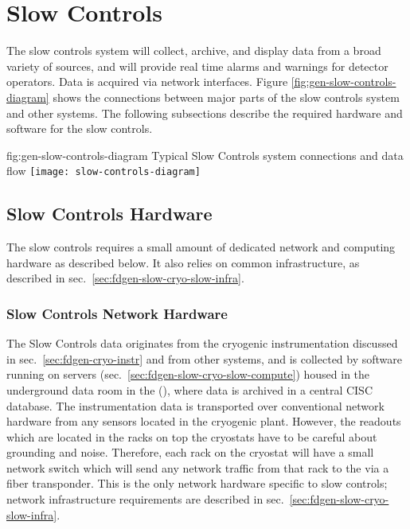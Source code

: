 \section{Slow Controls}
\label{sec:fdgen-slow-cryo-ctrl}


The slow controls system will collect, archive, and display data from
a broad variety of sources, and will provide real time alarms and
warnings for detector operators. Data is acquired via network
interfaces.  Figure \ref{fig:gen-slow-controls-diagram} shows the
connections between major parts of the slow controls system and other
systems.  The following subsections describe the required hardware and
software for the slow controls.

\begin{dunefigure}{fig:gen-slow-controls-diagram}
{Typical Slow Controls system connections and data flow}
\texttt{[image: slow-controls-diagram]}
\end{dunefigure}





\subsection{Slow Controls Hardware}
\label{sec:fdgen-slow-cryo-hdwr}

The slow controls requires a small amount of dedicated network and
computing hardware as described below.  It also relies on common
infrastructure, as described in
sec.\ \ref{sec:fdgen-slow-cryo-slow-infra}.

\subsubsection{Slow Controls Network Hardware}
\label{sec:fdgen-slow-cryo-slow-network}
The Slow Controls data originates from the cryogenic instrumentation discussed in
sec.~\ref{sec:fdgen-cryo-instr} and from other systems,
and is collected by software running on servers
(sec.~\ref{sec:fdgen-slow-cryo-slow-compute})
housed in the underground data room in the  (),
where data is archived in a central CISC database.
The instrumentation data is transported over
conventional network hardware from any sensors located in the cryogenic
plant.  However, the readouts which are located in the racks on top the
cryostats have to be careful about grounding and noise.  Therefore, each
rack on the cryostat will have a small network switch which will send
any network traffic from that rack to the  via a fiber transponder.
This is the only network hardware specific to slow controls;
network infrastructure requirements are described in
sec.\ \ref{sec:fdgen-slow-cryo-slow-infra}.

